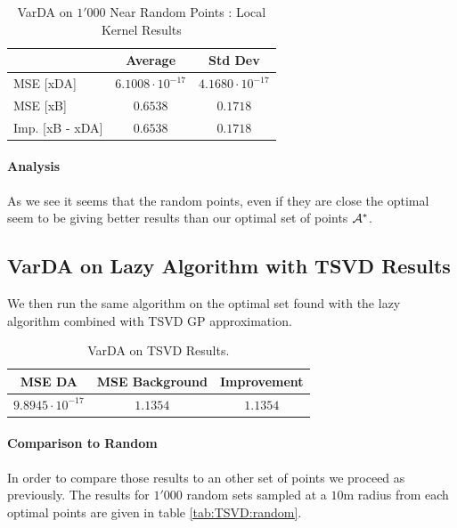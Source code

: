 \begin{table}[h]
\centering
\begin{tabular}{l|cc}
\toprule
               & Average & Std Dev \\ \midrule
MSE [xDA]      & $6.1008 \cdot 10^{-17}$  & $4.1680 \cdot 10^{-17}$  \\
MSE [xB]       & $0.6538$  & $0.1718$  \\
Imp. [xB - xDA]  &  $0.6538$  & $0.1718$ \\ \bottomrule
\end{tabular}
	\caption{VarDA on $1'000$ Near Random Points : Local Kernel Results}
	\label{tab:varDa:random}
\end{table}

\paragraph{Analysis}

As we see it seems that the random points, even if they are close the optimal seem to be giving better results than our optimal set of points $\mathcal{A}^*$. 



\subsection{VarDA on Lazy Algorithm with TSVD Results}

We then run the same algorithm on the optimal set found with the lazy algorithm combined with TSVD GP approximation. 

\begin{table}[h]
\centering
	\begin{tabular}{c|c|c}
	\toprule
		  MSE DA & MSE Background & Improvement \\ \midrule
		$9.8945 \cdot 10^{-17}$  &  $1.1354$ & $1.1354$ \\ \bottomrule
	\end{tabular}
	\caption{VarDA on TSVD Results. }
\end{table}

\paragraph{Comparison to Random}

In order to compare those results to an other set of points we proceed as previously. The results for $1'000$ random sets sampled at a $10$m radius from each optimal points are given in table 	\ref{tab:TSVD:random}. 
 \\


